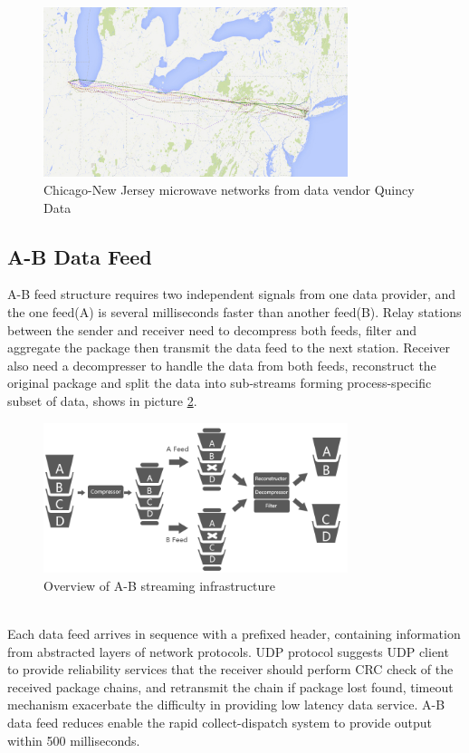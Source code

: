 \documentclass[11pt,openright,a4paper]{report}
\begin{document}
\begin{figure}[htbp]
\centering\includegraphics[width=3.5in]{picture/newyork-chicago.jpg}
\caption{Chicago-New Jersey microwave networks from data vendor Quincy Data}
\label{fig:2}
\end{figure}

\subsection{A-B Data Feed}
A-B feed structure requires two independent signals from one data provider, and the one feed(A) is several milliseconds faster than another feed(B). Relay stations between the sender and receiver need to decompress both feeds, filter and aggregate the package then transmit the data feed to the next station. Receiver also need a decompresser to handle the data from both feeds, reconstruct the original package and split the data into sub-streams forming process-specific subset of data, shows in picture \ref{fig:3}.\\
\begin{figure}[htbp]
	\centering\includegraphics[width=3.5in]{picture/A-BFeed.PNG}
	\caption{Overview of A-B streaming infrastructure}
	\label{fig:3}
\end{figure}\\
Each data feed arrives in sequence with a prefixed header, containing information from abstracted layers of network protocols\cite{udpprotocol}. UDP protocol suggests UDP client to provide reliability services that the receiver should perform CRC check of the received package chains, and retransmit the chain if package lost found, timeout mechanism exacerbate the difficulty in providing low latency data service. A-B data feed reduces enable the rapid collect-dispatch system to provide output within 500 milliseconds\cite{zusman1999fault}.\\
\end{document}
